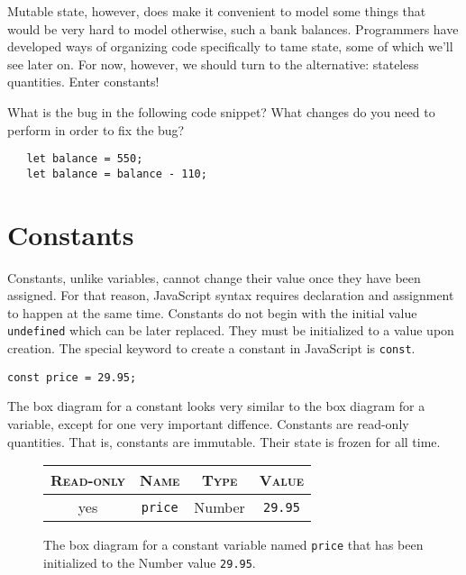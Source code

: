 Mutable state, however, does make it convenient to model some things that would
be very hard to model otherwise, such a bank balances. Programmers have
developed ways of organizing code specifically to tame state, some of which
we'll see later on. For now, however, we should turn to the alternative:
stateless quantities. Enter constants!

 \begin{question}
What is the bug in the following code snippet? What changes do you need to
perform in order to fix the bug?
   \begin{lstlisting}
   let balance = 550;
   let balance = balance - 110;
   \end{lstlisting}
 \end{question}

\section{Constants}
Constants, unlike variables, cannot change their value once they have been
assigned. For that reason, JavaScript syntax requires declaration and assignment
to happen at the same time. Constants do not begin with the initial value
\texttt{undefined} which can be later replaced. They must be initialized to a
value upon creation. The special keyword to create a constant in JavaScript is
\texttt{const}.

\begin{lstlisting}
const price = 29.95;
\end{lstlisting}

The box diagram for a constant looks very similar to the box diagram for a
variable, except for one very important diffence. Constants are read-only
quantities. That is, constants are immutable. Their state is frozen for all
time.

\begin{figure}[h]
  \sffamily
  \color{cyan}
  \begin{tabular}{|c|c|c|c|}
    \hline
    \textsc{Read-only} & \textsc{Name} & \textsc{Type} & \textsc{Value}\\
    \hline
    yes & \texttt{price} & Number & \texttt{29.95}\\
    \hline
  \end{tabular}
\caption{\label{fig:intro-constant} The box diagram for a constant variable
named \texttt{price} that has been initialized to the \textsf{Number} value
\texttt{29.95}.}
\end{figure}

